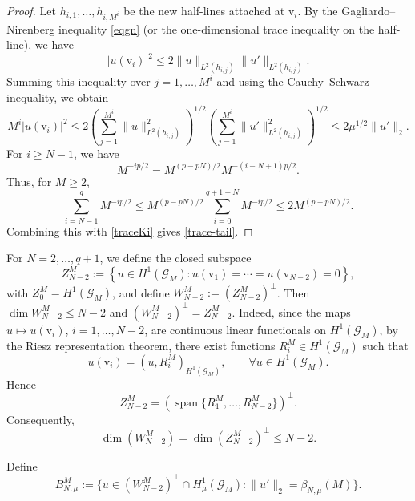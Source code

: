 \documentclass[11pt]{amsart}
\newcommand{\norm}[1]{\lVert#1\rVert}
\newcommand{\G}{\mathcal{G}}
\newcommand{\vv}{\mathrm{v}}
\numberwithin{equation}{section}
\begin{document}
\begin{proof}
Let $h_{i,1},\ldots,h_{i,M^{i}}$ be the new half-lines attached at $\vv_i$. By the Gagliardo--Nirenberg inequality \eqref{eqgn} (or the one-dimensional trace inequality on the half-line), we have
$$
|u(\vv_i)|^2\leq2\norm{u}_{L^2(h_{i,j})}\norm{u'}_{L^2(h_{i,j})}.
$$
Summing this inequality over $j=1,\ldots,M^{i}$ and using the Cauchy--Schwarz inequality, we obtain
\begin{equation}\label{traceKi}
M^{i}|u(\vv_i)|^2\leq2\left(\sum_{j=1}^{M^{i}}\norm{u}_{L^2(h_{i,j})}^2\right)^{1/2}\left(\sum_{j=1}^{M^{i}}\norm{u'}_{L^2(h_{i,j})}^2\right)^{1/2}\leq2\mu^{1/2}\norm{u'}_2.
\end{equation}
For $i\geq N-1$, we have
$$
M^{-ip/2}=M^{(p-pN)/2}M^{-(i-N+1)p/2}.
$$
Thus, for $M\geq2$,
$$
\sum_{i=N-1}^{q}M^{-ip/2}\leq M^{(p-pN)/2}\sum_{i=0}^{q+1-N}M^{-ip/2}\leq2M^{(p-pN)/2}.
$$
Combining this with \eqref{traceKi} gives \eqref{trace-tail}.
\end{proof}
For $N=2,\ldots,q+1$, we define the closed subspace
\begin{equation}\label{zero-trace-W}
Z_{N-2}^M
:=
\left\{
u\in H^1(\G_M):
u(\vv_1)=\cdots=u(\vv_{N-2})=0
\right\},
\end{equation}
with $Z_0^M=H^1(\G_M)$, and define $W_{N-2}^M:=\left(Z_{N-2}^M\right)^\perp$.
Then $\dim W_{N-2}^M\leq N-2$ and $\left(W_{N-2}^M\right)^\perp=Z_{N-2}^M$. Indeed,  since the maps
$u\mapsto u(\vv_i)$, $i=1,\ldots,N-2$,
are continuous linear functionals on $H^1(\G_M)$, by the
Riesz representation theorem, there exist functions
$R_i^M\in H^1(\G_M)$ such that
\[
u(\vv_i)=\left(u,R_i^M\right)_{H^1(\G_M)},
\qquad
\forall u\in H^1(\G_M).
\]
Hence
\[
Z_{N-2}^M
=
\left(\operatorname{span}\{R_1^M,\ldots,R_{N-2}^M\}\right)^\perp.
\]
Consequently,
\[
\dim \left(W_{N-2}^M\right) =\dim\left(Z_{N-2}^M\right)^\perp\leq N-2.
\]

Define
\begin{equation}\label{BNmu}
B_{N,\mu}^M:=\{u\in (W_{N-2}^M)^\perp\cap H^1_\mu(\G_M):\norm{u'}_2=\beta_{N,\mu}(M)\}.
\end{equation}
\end{document}
